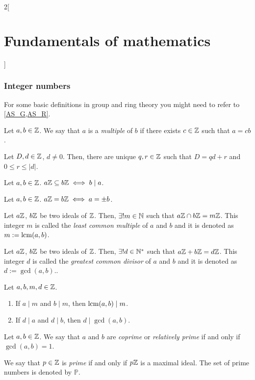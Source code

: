 \documentclass[../../../main_math.tex]{subfiles}
\begin{document}
\begin{multicols}{2}[\section{Fundamentals of mathematics}]
  \subsubsection{Integer numbers}
  For some basic definitions in group and ring theory you might need to refer to \cref{AS_G,AS_R}.
  \begin{definition}
    Let $a,b\in\mathbb{Z}$. We say that $a$ is a \emph{multiple} of $b$ if there exists $c\in\mathbb{Z}$ such that $a=cb$.
  \end{definition}
  \begin{theorem}
    Let $D,d\in\mathbb{Z}$, $d\ne 0$. Then, there are unique $q,r\in\mathbb{Z}$ such that $D=qd+r$ and $0\leq r\leq|d|$.
  \end{theorem}
  \begin{proposition}
    Let $a,b\in \mathbb{Z}$. $a\mathbb{Z}\subseteq b\mathbb{Z}\iff b\mid a$.
  \end{proposition}
  \begin{corollary}
    Let $a,b\in \mathbb{Z}$. $a\mathbb{Z}=b\mathbb{Z}\iff a=\pm b$.
  \end{corollary}
  \begin{proposition}
    Let $a\mathbb{Z}$, $b\mathbb{Z}$ be two ideals of $\mathbb{Z}$. Then, $\exists!m\in\mathbb{N}$ such that $a\mathbb{Z}\cap b\mathbb{Z}=m\mathbb{Z}$. This integer $m$ is called the \emph{least common multiple} of $a$ and $b$ and it is denoted as $m:=\operatorname{lcm}(a,b)$.
  \end{proposition}
  \begin{proposition}
    Let $a\mathbb{Z}$, $b\mathbb{Z}$ be two ideals of $\mathbb{Z}$. Then, $\exists!d\in\mathbb{N}^*$ such that $a\mathbb{Z}+b\mathbb{Z}=d\mathbb{Z}$. This integer $d$ is called the \emph{greatest common divisor} of $a$ and $b$ and it is denoted as $d:=\gcd(a,b)$..
  \end{proposition}
  \begin{proposition}
    Let $a,b,m,d\in\mathbb{Z}$.
    \begin{enumerate}
      \item If $a\mid m$ and $b\mid m$, then $\operatorname{lcm}(a,b)\mid m$.
      \item If $d\mid a$ and $d\mid b$, then $d\mid\gcd(a,b)$.
    \end{enumerate}
  \end{proposition}
  \begin{definition}
    Let $a,b\in\mathbb{Z}$. We say that $a$ and $b$ are \emph{coprime} or \emph{relatively prime} if and only if $\gcd(a,b)=1$.
  \end{definition}
  \begin{definition}
    We say that $p\in\mathbb{Z}$ is \emph{prime} if and only if $p\mathbb{Z}$ is a maximal ideal. The set of prime numbers is denoted by $\mathbb{P}$.

\end{definition}
\end{multicols}
\end{document}
